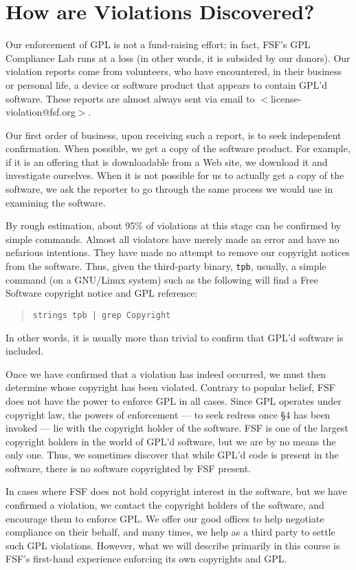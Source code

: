 {\section{How are Violations Discovered?}

Our enforcement of GPL is not a fund-raising effort; in fact, FSF's GPL
Compliance Lab runs at a loss (in other words, it is subsided by our
donors). Our violation reports come from volunteers, who have encountered,
in their business or personal life, a device or software product that
appears to contain GPL'd software. These reports are almost always sent
via email to $<$license-violation@fsf.org$>$.

Our first order of business, upon receiving such a report, is to seek
independent confirmation. When possible, we get a copy of the software
product. For example, if it is an offering that is downloadable from a
Web site, we download it and investigate ourselves. When it is not
possible for us to actually get a copy of the software, we ask the
reporter to go through the same process we would use in examining the
software.

By rough estimation, about 95\% of violations at this stage can be
confirmed by simple commands. Almost all violators have merely made an
error and have no nefarious intentions. They have made no attempt to
remove our copyright notices from the software. Thus, given the
third-party binary, {\tt tpb}, usually, a simple command (on a GNU/Linux
system) such as the following will find a Free Software copyright notice
and GPL reference:
\begin{quotation}
{\tt strings tpb | grep Copyright}
\end{quotation}
In other words, it is usually more than trivial to confirm that GPL'd
software is included.

Once we have confirmed that a violation has indeed occurred, we must then
determine whose copyright has been violated. Contrary to popular belief,
FSF does not have the power to enforce GPL in all cases. Since GPL
operates under copyright law, the powers of enforcement --- to seek
redress once \S 4 has been invoked --- lie with the copyright holder of
the software. FSF is one of the largest copyright holders in the world of
GPL'd software, but we are by no means the only one. Thus, we sometimes
discover that while GPL'd code is present in the software, there is no
software copyrighted by FSF present.

In cases where FSF does not hold copyright interest in the software, but
we have confirmed a violation, we contact the copyright holders of the
software, and encourage them to enforce GPL\@. We offer our good offices
to help negotiate compliance on their behalf, and many times, we help as a
third party to settle such GPL violations. However, what we will describe
primarily in this course is FSF's first-hand experience enforcing its own
copyrights and GPL\@.

}
